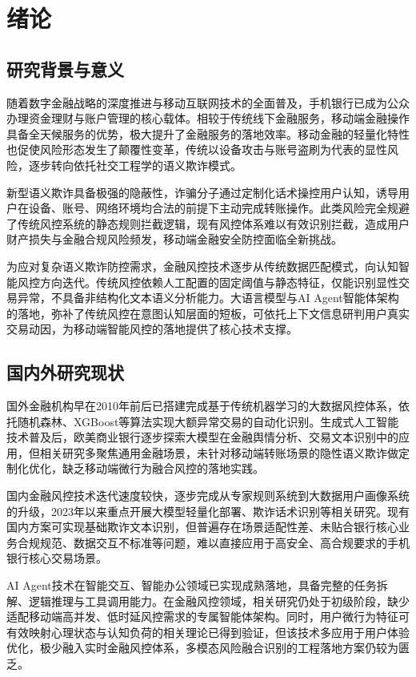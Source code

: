\documentclass[twoside,openright]{xduugthesis}
\begin{document}
\chapter{绪论}

\section{研究背景与意义}

随着数字金融战略的深度推进与移动互联网技术的全面普及，手机银行已成为公众办理资金理财与账户管理的核心载体。相较于传统线下金融服务，移动端金融操作具备全天候服务的优势，极大提升了金融服务的落地效率。移动金融的轻量化特性也促使风险形态发生了颠覆性变革，传统以设备攻击与账号盗刷为代表的显性风险，逐步转向依托社交工程学的语义欺诈模式\cite{ahi2025risks}。

新型语义欺诈具备极强的隐蔽性，诈骗分子通过定制化话术操控用户认知，诱导用户在设备、账号、网络环境均合法的前提下主动完成转账操作。此类风险完全规避了传统风控系统的静态规则拦截逻辑，现有风控体系难以有效识别拦截，造成用户财产损失与金融合规风险频发，移动端金融安全防控面临全新挑战。

为应对复杂语义欺诈防控需求，金融风控技术逐步从传统数据匹配模式，向认知智能风控方向迭代。传统风控依赖人工配置的固定阈值与静态特征，仅能识别显性交易异常，不具备非结构化文本语义分析能力。大语言模型与AI Agent智能体架构的落地，弥补了传统风控在意图认知层面的短板，可依托上下文信息研判用户真实交易动因，为移动端智能风控的落地提供了核心技术支撑。

\section{国内外研究现状}

国外金融机构早在2010年前后已搭建完成基于传统机器学习的大数据风控体系，依托随机森林、XGBoost等算法实现大额异常交易的自动化识别\cite{dubey2025transformer}。生成式人工智能技术普及后，欧美商业银行逐步探索大模型在金融舆情分析、交易文本识别中的应用，但相关研究多聚焦通用金融场景，未针对移动端转账场景的隐性语义欺诈做定制化优化，缺乏移动端微行为融合风控的落地实践。

国内金融风控技术迭代速度较快，逐步完成从专家规则系统到大数据用户画像系统的升级，2023年以来重点开展大模型轻量化部署、欺诈话术识别等相关研究\cite{nie2025multimodal}。现有国内方案可实现基础欺诈文本识别，但普遍存在场景适配性差、未贴合银行核心业务合规规范、数据交互不标准等问题，难以直接应用于高安全、高合规要求的手机银行核心交易场景。

AI Agent技术在智能交互、智能办公领域已实现成熟落地，具备完整的任务拆解、逻辑推理与工具调用能力。在金融风控领域，相关研究仍处于初级阶段，缺少适配移动端高并发、低时延风控需求的专属智能体架构。同时，用户微行为特征可有效映射心理状态与认知负荷的相关理论已得到验证，但该技术多应用于用户体验优化，极少融入实时金融风控体系，多模态风险融合识别的工程落地方案仍较为匮乏。
\end{document}

